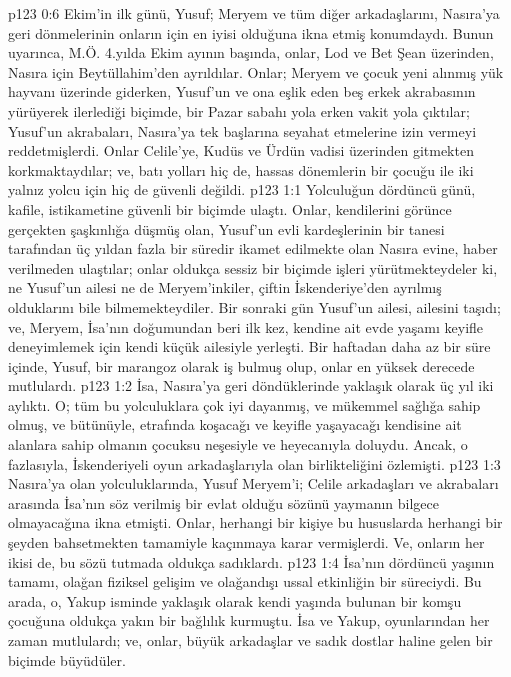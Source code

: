 \vs p123 0:6 Ekim’in ilk günü, Yusuf; Meryem ve tüm diğer arkadaşlarını, Nasıra’ya geri dönmelerinin onların için en iyisi olduğuna ikna etmiş konumdaydı. Bunun uyarınca, M.Ö. 4.yılda Ekim ayının başında, onlar, Lod ve Bet Şean üzerinden, Nasıra için Beytüllahim’den ayrıldılar. Onlar; Meryem ve çocuk yeni alınmış yük hayvanı üzerinde giderken, Yusuf’un ve ona eşlik eden beş erkek akrabasının yürüyerek ilerlediği biçimde, bir Pazar sabahı yola erken vakit yola çıktılar; Yusuf’un akrabaları, Nasıra’ya tek başlarına seyahat etmelerine izin vermeyi reddetmişlerdi. Onlar Celile’ye, Kudüs ve Ürdün vadisi üzerinden gitmekten korkmaktaydılar; ve, batı yolları hiç de, hassas dönemlerin bir çocuğu ile iki yalnız yolcu için hiç de güvenli değildi.
\vs p123 1:1 Yolculuğun dördüncü günü, kafile, istikametine güvenli bir biçimde ulaştı. Onlar, kendilerini görünce gerçekten şaşkınlığa düşmüş olan, Yusuf’un evli kardeşlerinin bir tanesi tarafından üç yıldan fazla bir süredir ikamet edilmekte olan Nasıra evine, haber verilmeden ulaştılar; onlar oldukça sessiz bir biçimde işleri yürütmekteydeler ki, ne Yusuf’un ailesi ne de Meryem’inkiler, çiftin İskenderiye’den ayrılmış olduklarını bile bilmemekteydiler. Bir sonraki gün Yusuf’un ailesi, ailesini taşıdı; ve, Meryem, İsa’nın doğumundan beri ilk kez, kendine ait evde yaşamı keyifle deneyimlemek için kendi küçük ailesiyle yerleşti. Bir haftadan daha az bir süre içinde, Yusuf, bir marangoz olarak iş bulmuş olup, onlar en yüksek derecede mutlulardı.
\vs p123 1:2 İsa, Nasıra’ya geri döndüklerinde yaklaşık olarak üç yıl iki aylıktı. O; tüm bu yolculuklara çok iyi dayanmış, ve mükemmel sağlığa sahip olmuş, ve bütünüyle, etrafında koşacağı ve keyifle yaşayacağı kendisine ait alanlara sahip olmanın çocuksu neşesiyle ve heyecanıyla doluydu. Ancak, o fazlasıyla, İskenderiyeli oyun arkadaşlarıyla olan birlikteliğini özlemişti.
\vs p123 1:3 Nasıra’ya olan yolculuklarında, Yusuf Meryem’i; Celile arkadaşları ve akrabaları arasında İsa’nın söz verilmiş bir evlat olduğu sözünü yaymanın bilgece olmayacağına ikna etmişti. Onlar, herhangi bir kişiye bu hususlarda herhangi bir şeyden bahsetmekten tamamiyle kaçınmaya karar vermişlerdi. Ve, onların her ikisi de, bu sözü tutmada oldukça sadıklardı.
\vs p123 1:4 İsa’nın dördüncü yaşının tamamı, olağan fiziksel gelişim ve olağandışı ussal etkinliğin bir süreciydi. Bu arada, o, Yakup isminde yaklaşık olarak kendi yaşında bulunan bir komşu çocuğuna oldukça yakın bir bağlılık kurmuştu. İsa ve Yakup, oyunlarından her zaman mutlulardı; ve, onlar, büyük arkadaşlar ve sadık dostlar haline gelen bir biçimde büyüdüler.
